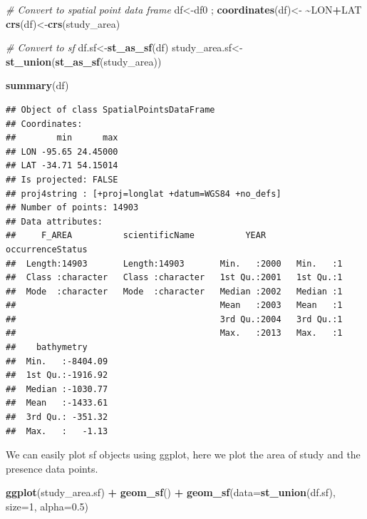 \documentclass[
]{book}
\newenvironment{Shaded}{\begin{snugshade}}{\end{snugshade}}
\newcommand{\AttributeTok}[1]{\textcolor[rgb]{0.13,0.29,0.53}{#1}}
\newcommand{\CommentTok}[1]{\textcolor[rgb]{0.56,0.35,0.01}{\textit{#1}}}
\newcommand{\DecValTok}[1]{\textcolor[rgb]{0.00,0.00,0.81}{#1}}
\newcommand{\ErrorTok}[1]{\textcolor[rgb]{0.64,0.00,0.00}{\textbf{#1}}}
\newcommand{\FloatTok}[1]{\textcolor[rgb]{0.00,0.00,0.81}{#1}}
\newcommand{\FunctionTok}[1]{\textcolor[rgb]{0.13,0.29,0.53}{\textbf{#1}}}
\newcommand{\NormalTok}[1]{#1}
\newcommand{\OtherTok}[1]{\textcolor[rgb]{0.56,0.35,0.01}{#1}}
\newcommand{\SpecialCharTok}[1]{\textcolor[rgb]{0.81,0.36,0.00}{\textbf{#1}}}
\begin{document}
\begin{Shaded}
\begin{Highlighting}[]
\CommentTok{\# Convert to spatial point data frame}
\NormalTok{df}\OtherTok{\textless{}{-}}\NormalTok{df0 ; }\FunctionTok{coordinates}\NormalTok{(df)}\OtherTok{\textless{}{-}} \ErrorTok{\textasciitilde{}}\NormalTok{LON}\SpecialCharTok{+}\NormalTok{LAT}
\FunctionTok{crs}\NormalTok{(df)}\OtherTok{\textless{}{-}}\FunctionTok{crs}\NormalTok{(study\_area)}

\CommentTok{\# Convert to sf}
\NormalTok{df.sf}\OtherTok{\textless{}{-}}\FunctionTok{st\_as\_sf}\NormalTok{(df)}
\NormalTok{study\_area.sf}\OtherTok{\textless{}{-}}\FunctionTok{st\_union}\NormalTok{(}\FunctionTok{st\_as\_sf}\NormalTok{(study\_area))}


\FunctionTok{summary}\NormalTok{(df)}
\end{Highlighting}
\end{Shaded}

\begin{verbatim}
## Object of class SpatialPointsDataFrame
## Coordinates:
##        min      max
## LON -95.65 24.45000
## LAT -34.71 54.15014
## Is projected: FALSE 
## proj4string : [+proj=longlat +datum=WGS84 +no_defs]
## Number of points: 14903
## Data attributes:
##     F_AREA          scientificName          YEAR      occurrenceStatus
##  Length:14903       Length:14903       Min.   :2000   Min.   :1       
##  Class :character   Class :character   1st Qu.:2001   1st Qu.:1       
##  Mode  :character   Mode  :character   Median :2002   Median :1       
##                                        Mean   :2003   Mean   :1       
##                                        3rd Qu.:2004   3rd Qu.:1       
##                                        Max.   :2013   Max.   :1       
##    bathymetry      
##  Min.   :-8404.09  
##  1st Qu.:-1916.92  
##  Median :-1030.77  
##  Mean   :-1433.61  
##  3rd Qu.: -351.32  
##  Max.   :   -1.13
\end{verbatim}

We can easily plot sf objects using ggplot, here we plot the area of study and the presence data points.

\begin{Shaded}
\begin{Highlighting}[]
\FunctionTok{ggplot}\NormalTok{(study\_area.sf) }\SpecialCharTok{+} 
  \FunctionTok{geom\_sf}\NormalTok{() }\SpecialCharTok{+} 
  \FunctionTok{geom\_sf}\NormalTok{(}\AttributeTok{data=}\FunctionTok{st\_union}\NormalTok{(df.sf),}
          \AttributeTok{size=}\DecValTok{1}\NormalTok{,}
          \AttributeTok{alpha=}\FloatTok{0.5}\NormalTok{)}
\end{Highlighting}
\end{Shaded}
\end{document}
